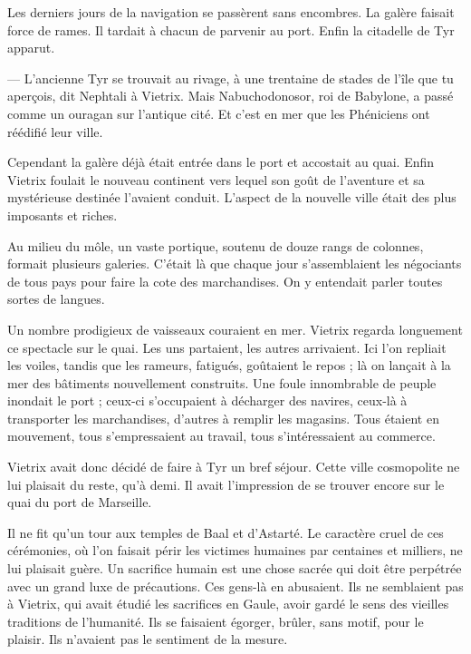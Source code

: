 \documentclass[a4paper, 11pt, oneside, polutonikogreek, french]{article}
\begin{document}
\bigskip
\centerline{\EightStarTaper}
\centerline{\EightStarTaper\EightStarTaper}
\bigskip

Les derniers jours de la navigation se passèrent sans encombres. La galère faisait force de rames. Il tardait à chacun de parvenir au port. Enfin la citadelle de Tyr apparut.

--- L'ancienne Tyr se trouvait au rivage, à une trentaine de stades de l'île que tu aperçois, dit Nephtali à Vietrix. Mais Nabuchodonosor, roi de Babylone, a passé comme un ouragan sur l'antique cité. Et c'est en mer que les Phéniciens ont réédifié leur ville.

Cependant la galère déjà était entrée dans le port et accostait au quai. Enfin Vietrix foulait le nouveau continent vers lequel son goût de l'aventure et sa mystérieuse destinée l'avaient conduit. L'aspect de la nouvelle ville était des plus imposants et riches.

Au milieu du môle, un vaste portique, soutenu de douze rangs de colonnes, formait plusieurs galeries. C'était là que chaque jour s'assemblaient les négociants de tous pays pour faire la cote des marchandises. On y entendait parler toutes sortes de langues.

Un nombre prodigieux de vaisseaux couraient en mer. Vietrix regarda longuement ce spectacle sur le quai. Les uns partaient, les autres arrivaient. Ici l'on repliait les voiles, tandis que les rameurs, fatigués, goûtaient le repos ; là on lançait à la mer des bâtiments nouvellement construits. Une foule innombrable de peuple inondait le port ; ceux-ci s'occupaient à décharger des navires, ceux-là à transporter les marchandises, d'autres à remplir les magasins. Tous étaient en mouvement, tous s'empressaient au travail, tous s'intéressaient au commerce.

\bigskip
\centerline{\EightStarTaper}
\centerline{\EightStarTaper\EightStarTaper}
\bigskip

Vietrix avait donc décidé de faire à Tyr un bref séjour. Cette ville cosmopolite ne lui plaisait du reste, qu'à demi. Il avait l'impression de se trouver encore sur le quai du port de Marseille.

\bigskip
\centerline{\EightStarTaper}
\centerline{\EightStarTaper\EightStarTaper}
\bigskip

Il ne fit qu'un tour aux temples de Baal et d'Astarté. Le caractère cruel de ces cérémonies, où l'on faisait périr les victimes humaines par centaines et milliers, ne lui plaisait guère. Un sacrifice humain est une chose sacrée qui doit être perpétrée avec un grand luxe de précautions. Ces gens-là en abusaient. Ils ne semblaient pas à Vietrix, qui avait étudié les sacrifices en Gaule, avoir gardé le sens des vieilles traditions de l'humanité. Ils se faisaient égorger, brûler, sans motif, pour le plaisir. Ils n'avaient pas le sentiment de la mesure.
\end{document}
